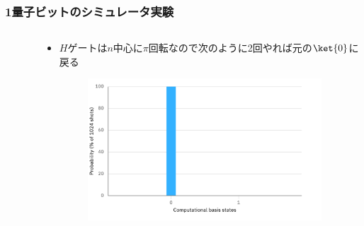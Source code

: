 \begin{frame}
  \frametitle{1量子ビットのシミュレータ実験}

  \begin{columns}
    \begin{column}{0.4\textwidth}
      \begin{figure}
        \HGateFigure
      \end{figure}
    \end{column}
    \begin{column}{0.6\textwidth}
      \begin{itemize}
        \item $H$ゲートは$n$中心に$\pi$回転なので次のように2回やれば元の$\ket{0}$に戻る
        \begin{figure}
          \centering
        \end{figure}
        \begin{figure}
          \includegraphics[width=0.95\textwidth]{./img/hgate_hgate_histogram.pdf}
        \end{figure}
      \end{itemize}
    \end{column}
  \end{columns}
\end{frame}

